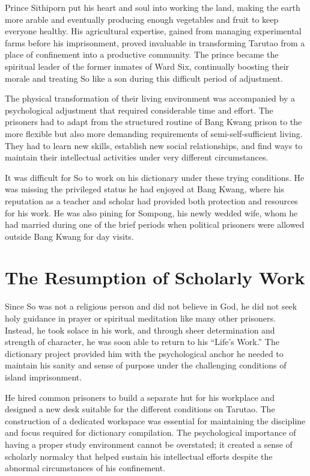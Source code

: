 \documentclass[
  Letterpaper,
]{scrbook}
\begin{document}
Prince Sithiporn put his heart and soul into working the land, making
the earth more arable and eventually producing enough vegetables and
fruit to keep everyone healthy. His agricultural expertise, gained from
managing experimental farms before his imprisonment, proved invaluable
in transforming Tarutao from a place of confinement into a productive
community. The prince became the spiritual leader of the former inmates
of Ward Six, continually boosting their morale and treating So like a
son during this difficult period of adjustment.

The physical transformation of their living environment was accompanied
by a psychological adjustment that required considerable time and
effort. The prisoners had to adapt from the structured routine of Bang
Kwang prison to the more flexible but also more demanding requirements
of semi-self-sufficient living. They had to learn new skills, establish
new social relationships, and find ways to maintain their intellectual
activities under very different circumstances.

It was difficult for So to work on his dictionary under these trying
conditions. He was missing the privileged status he had enjoyed at Bang
Kwang, where his reputation as a teacher and scholar had provided both
protection and resources for his work. He was also pining for Sompong,
his newly wedded wife, whom he had married during one of the brief
periods when political prisoners were allowed outside Bang Kwang for day
visits.

\section{The Resumption of Scholarly
Work}\label{the-resumption-of-scholarly-work}

Since So was not a religious person and did not believe in God, he did
not seek holy guidance in prayer or spiritual meditation like many other
prisoners. Instead, he took solace in his work, and through sheer
determination and strength of character, he was soon able to return to
his ``Life's Work.'' The dictionary project provided him with the
psychological anchor he needed to maintain his sanity and sense of
purpose under the challenging conditions of island imprisonment.

He hired common prisoners to build a separate hut for his workplace and
designed a new desk suitable for the different conditions on Tarutao.
The construction of a dedicated workspace was essential for maintaining
the discipline and focus required for dictionary compilation. The
psychological importance of having a proper study environment cannot be
overstated; it created a sense of scholarly normalcy that helped sustain
his intellectual efforts despite the abnormal circumstances of his
confinement.
\end{document}
